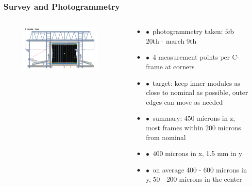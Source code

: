 \documentclass[aspectratio=1610, 12pt, xcolor=dvipsnames]{beamer}
\begin{document}
\begin{frame}\frametitle{Survey and Photogrammetry}
  \begin{columns}
    \begin{column}[c]{0.48\textwidth}
      \begin{figure}
        \includegraphics[width=0.9\textwidth]{plots/survey_photo.png}
      \end{figure}
    \end{column}
    \begin{column}[c]{0.48\textwidth}
      \begin{itemize}
        \item $\bullet$\, photogrammetry taken: feb 20th - march 9th
        \item $\bullet$\, 4 measurement points per C-frame at corners
        \item $\bullet$\, target: keep inner modules as close to nominal as possible, outer edges can move as needed
        \item $\bullet$\, summary: 450 microns in z, most frames within 200 microns from nominal
        \item $\bullet$\, 400 microns in x, 1.5 mm in y
        \item $\bullet$\, on average 400 - 600 microns in y, 50 - 200 microns in the center
      \end{itemize}
    \end{column}
  \end{columns}
\end{frame}
\end{document}
